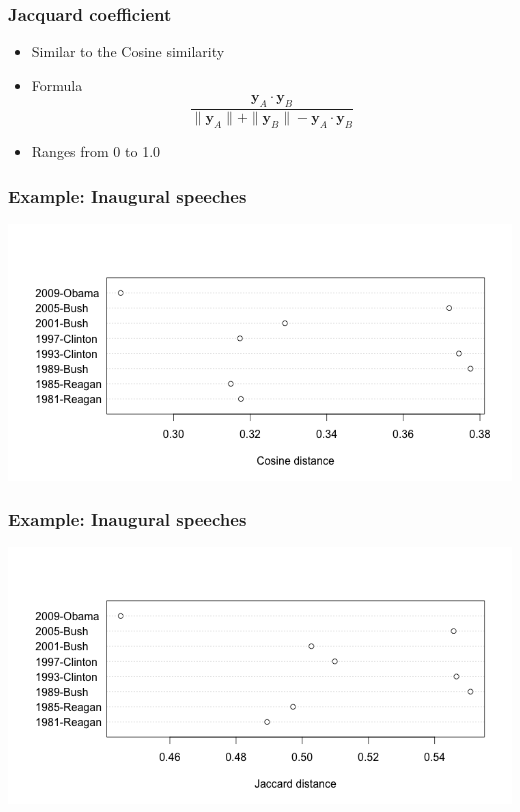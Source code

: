 \documentclass{beamer}
\begin{document}
\begin{frame}
	\frametitle{Jacquard coefficient}
	\begin{itemize}
		\item Similar to the Cosine similarity
		\item Formula
		\begin{equation}
		\frac{\mathbf{y}_{A} \cdot \mathbf{y}_{B}}{\| \mathbf{y}_{A}\|
			+ \| \mathbf{y}_{B}\|  - \mathbf{y}_{A} \cdot \mathbf{y}_{B}}
		\end{equation}
		\item Ranges from 0 to 1.0
	\end{itemize}
\end{frame}

\begin{frame}
	\frametitle{Example: Inaugural speeches}
	\begin{center}
		\includegraphics[width=.9\textwidth]{figures/prescosinedist.png}
	\end{center}
\end{frame}

\begin{frame}
	\frametitle{Example: Inaugural speeches}
	\begin{center}
		\includegraphics[width=.9\textwidth]{figures/presjaccarddist.png}
	\end{center}
\end{frame}
\end{document}
